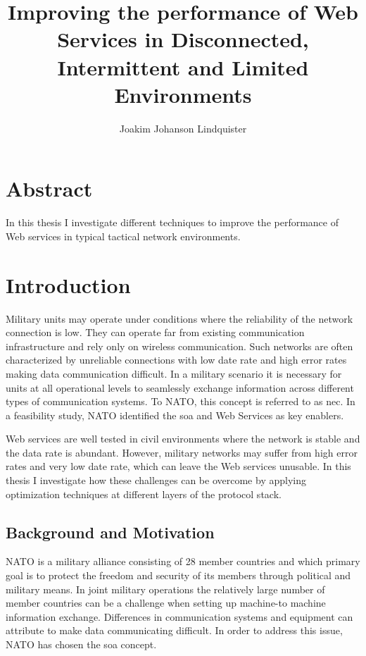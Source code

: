 \documentclass[USenglish]{ifimaster}
\title{Improving the performance of Web Services in Disconnected, Intermittent
and Limited Environments}
\author{Joakim Johanson Lindquister}
\begin{document}
\ififorside{}

\chapter*{Abstract}
In this thesis I investigate different techniques to improve the performance of
Web services in typical tactical network environments.
\pagebreak

\tableofcontents
\listoftables
\listoffigures

\pagebreak


\chapter{Introduction}
Military units may operate under conditions where the reliability of the network
connection is low. They can operate far from existing communication
infrastructure and rely only on wireless communication. Such networks are often
characterized by unreliable connections with low date rate and high error rates
making data communication difficult. In a military scenario it is necessary for
units at all operational levels to seamlessly exchange information across
different types of communication systems. To NATO, this concept is referred to
as \gls{nec}. In a feasibility study, NATO identified the \gls{soa} and Web
Services as key enablers\cite{nnec-study}.

Web services are well tested in civil environments where the network is stable
and the data rate is abundant. However, military networks may suffer from high
error rates and very low date rate, which can leave the Web services unusable.
In this thesis I investigate how these challenges can be overcome by applying
optimization techniques at different layers of the protocol stack.

\section{Background and Motivation}
NATO is a military alliance consisting of 28 member
countries\cite{nato-homepage-member-countries} and which primary goal is to
protect the freedom and security of its members through political and military
means. In joint military operations the relatively large number of member
countries can be a challenge when setting up machine-to machine information
exchange. Differences in communication systems and equipment can attribute to
make data communicating difficult. In order to address this issue, NATO has
chosen the \gls{soa} concept\cite{IST-090}.
\end{document}
